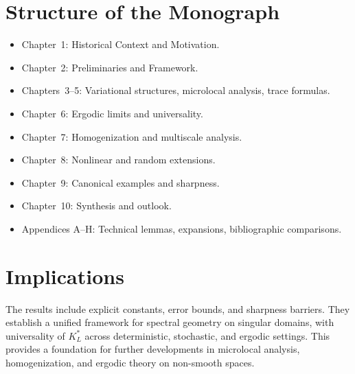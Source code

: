 \section*{Structure of the Monograph}

\begin{itemize}
    \item Chapter~1: Historical Context and Motivation.
    \item Chapter~2: Preliminaries and Framework.
    \item Chapters~3--5: Variational structures, microlocal analysis, trace formulas.
    \item Chapter~6: Ergodic limits and universality.
    \item Chapter~7: Homogenization and multiscale analysis.
    \item Chapter~8: Nonlinear and random extensions.
    \item Chapter~9: Canonical examples and sharpness.
    \item Chapter~10: Synthesis and outlook.
    \item Appendices A--H: Technical lemmas, expansions, bibliographic comparisons.
\end{itemize}

\section*{Implications}

The results include explicit constants, error bounds, and sharpness barriers. 
They establish a unified framework for spectral geometry on singular domains, 
with universality of $K_L^*$ across deterministic, stochastic, and ergodic settings. 
This provides a foundation for further developments in microlocal analysis, 
homogenization, and ergodic theory on non-smooth spaces.

